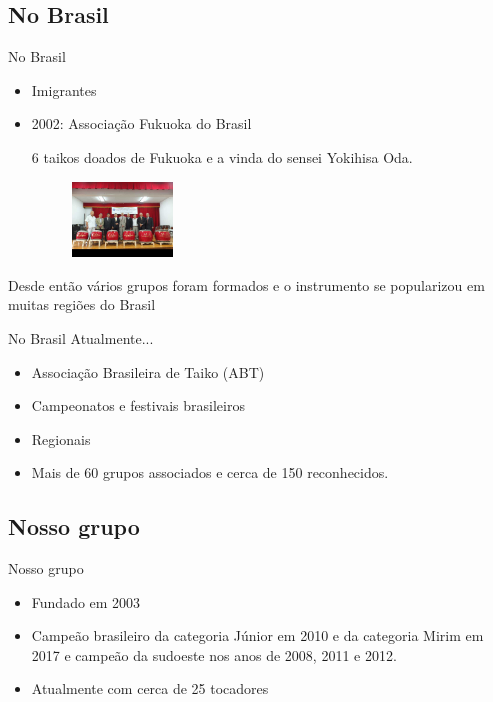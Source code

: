 \documentclass{beamer}
\begin{document}
\subsection {No Brasil}
\begin{frame}{No Brasil}
    \pause
    \begin{itemize}
        \item Imigrantes\pause
        \item 2002: Associação Fukuoka do Brasil\pause

            6 taikos doados de Fukuoka e a vinda do sensei Yokihisa Oda.
            \begin{figure}
                \includegraphics[height=2cm]{fukuoka}
            \end{figure}
    \end{itemize}\pause
    Desde então vários grupos foram formados e o instrumento se popularizou em muitas regiões do Brasil
\end{frame}

\begin{frame}{No Brasil}
    Atualmente...\pause
    \begin{itemize}
        \item Associação Brasileira de Taiko (ABT)
            \pause
        \item Campeonatos e festivais brasileiros
            \pause
        \item Regionais
            \pause
        \item Mais de 60 grupos associados e cerca de 150 reconhecidos.
    \end{itemize}
\end{frame}

\subsection {Nosso grupo}
\begin{frame}{Nosso grupo}
    \pause
    \begin{itemize}
        \item Fundado em 2003
            \pause

        \item Campeão brasileiro da categoria Júnior em 2010 e da categoria Mirim em 2017 e campeão da sudoeste nos anos de  2008, 2011 e 2012.
            \pause

        \item Atualmente com cerca de 25 tocadores
    \end{itemize}
\end{frame}
\end{document}
